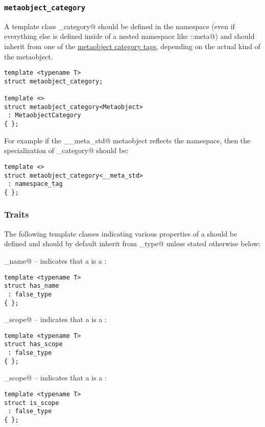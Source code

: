 \subsubsection{\texttt{metaobject\_category}}

A template class \verb@metaobject_category@ should be defined in the \verb@std@ namespace
(even if everything else is defined inside of a nested namespace like \verb@std::meta@)
and should inherit from
one of the \hyperref[metaobject-category-tags]{metaobject category tags}, depending on
the actual kind of the metaobject.

\begin{verbatim}
template <typename T>
struct metaobject_category;

template <>
struct metaobject_category<Metaobject>
 : MetaobjectCategory
{ };
\end{verbatim}

For example if the \verb@__meta_std@ metaobject reflects the \verb@std@ namespace,
then the specialization of \verb@metaobject_category@ should be:

\begin{verbatim}
template <>
struct metaobject_category<__meta_std>
 : namespace_tag
{ };
\end{verbatim}

\subsubsection{Traits}

The following template classes indicating various properties of a 
should be defined and should by default inherit from \verb@false_type@ unless stated
otherwise below:

\verb@has_name@ -- indicates that a  is a :
\begin{verbatim}
template <typename T>
struct has_name
 : false_type
{ };
\end{verbatim}

\verb@has_scope@ -- indicates that a  is a :
\begin{verbatim}
template <typename T>
struct has_scope
 : false_type
{ };
\end{verbatim}

\verb@is_scope@ -- indicates that a  is a :
\begin{verbatim}
template <typename T>
struct is_scope
 : false_type
{ };
\end{verbatim}

